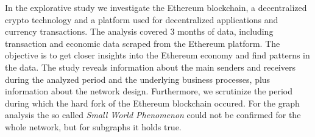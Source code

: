 In the explorative study we investigate the Ethereum blockchain,  a decentralized crypto technology and a platform used for decentralized applications and currency transactions. 
The analysis covered 3 months of data, including transaction and economic data scraped from the Ethereum platform. 
The objective is to get closer insights into the Ethereum economy and find patterns in the data.
The study reveals information about the main senders and receivers during the analyzed period and the underlying business processes, plus information about the network design. 
Furthermore, we scrutinize the period during which the hard fork of the Ethereum blockchain occured.
For the graph analysis the so called \emph{Small World Phenomenon} could not be confirmed for the whole network, but for subgraphs it holds true.